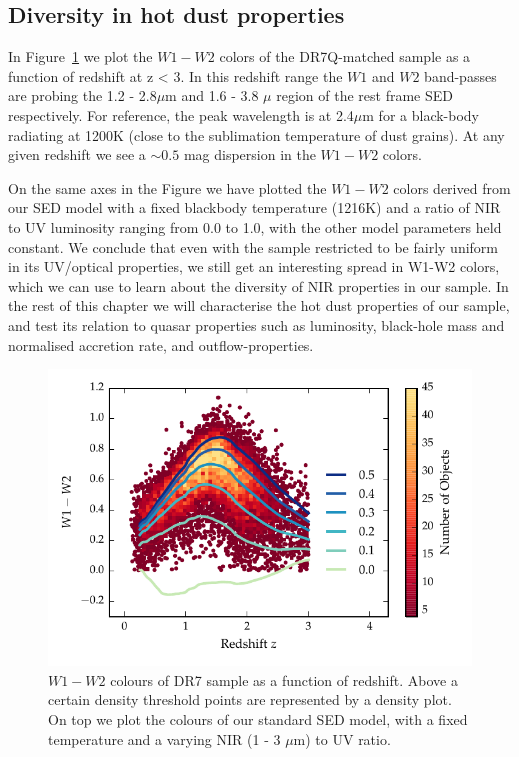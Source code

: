 \subsection{Diversity in hot dust properties}

In Figure~\ref{fig:w1w2colorsratio} we plot the $W1 - W2$ colors of the DR7Q-matched sample as a function of redshift at z < 3. 
In this redshift range the $W1$ and $W2$ band-passes are probing the 1.2 - 2.8$\mu$m and 1.6 - 3.8 $\mu$ region of the rest frame SED respectively. 
For reference, the peak wavelength is at 2.4$\mu$m for a black-body radiating at 1200K (close to the sublimation temperature of dust grains). 
At any given redshift we see a $\sim 0.5$ mag dispersion in the $W1-W2$ colors. 

On the same axes in the Figure we have plotted the $W1 - W2$ colors derived from our SED model with a fixed blackbody temperature (1216K) and a ratio of NIR to UV luminosity ranging from 0.0 to 1.0, with the other model parameters held constant. 
We conclude that even with the sample restricted to be fairly uniform in its UV/optical properties, we still get an interesting spread in W1-W2 colors, which we can use to learn about the diversity of NIR properties in our sample. 
In the rest of this chapter we will characterise the hot dust properties of our sample, and test its relation to quasar properties such as luminosity, black-hole mass and normalised accretion rate, and outflow-properties. 

\begin{figure}
\centering
\includegraphics[width=\columnwidth]{figures/chapter05/w1w2_versus_redshift_ratio.pdf}
\caption{$W1 - W2$ colours of DR7 sample as a function of redshift. Above a certain density threshold points are represented by a density plot. On top we plot the colours of our standard SED model, with a fixed temperature and a varying NIR (1 - 3 $\mu$m) to UV ratio.}
  \label{fig:w1w2colorsratio}
\end{figure}

